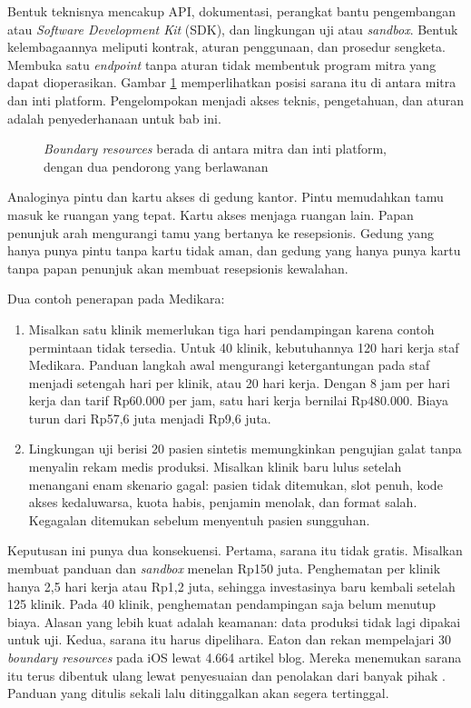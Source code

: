 Bentuk teknisnya mencakup API, dokumentasi, perangkat bantu pengembangan atau \textit{Software
Development Kit} (SDK), dan lingkungan uji atau \textit{sandbox}. Bentuk kelembagaannya meliputi
kontrak, aturan penggunaan, dan prosedur sengketa. Membuka satu \textit{endpoint} tanpa aturan tidak
membentuk program mitra yang dapat dioperasikan. Gambar \ref{fig:ch03-boundary-resources}
memperlihatkan posisi sarana itu di antara mitra dan inti platform. Pengelompokan menjadi akses
teknis, pengetahuan, dan aturan adalah penyederhanaan untuk bab ini.

\begin{figure}[!htb]
  \centering
  
  \caption{\textit{Boundary resources} berada di antara mitra dan inti platform, dengan dua pendorong
           yang berlawanan}
  \label{fig:ch03-boundary-resources}
\end{figure}

Analoginya pintu dan kartu akses di gedung kantor. Pintu memudahkan tamu masuk ke ruangan yang tepat.
Kartu akses menjaga ruangan lain. Papan penunjuk arah mengurangi tamu yang bertanya ke resepsionis.
Gedung yang hanya punya pintu tanpa kartu tidak aman, dan gedung yang hanya punya kartu tanpa papan
penunjuk akan membuat resepsionis kewalahan.

Dua contoh penerapan pada Medikara:
\begin{enumerate}
  \item Misalkan satu klinik memerlukan tiga hari pendampingan karena contoh permintaan tidak tersedia.
        Untuk 40 klinik, kebutuhannya 120 hari kerja staf Medikara. Panduan langkah awal mengurangi
        ketergantungan pada staf menjadi setengah hari per klinik, atau 20 hari kerja. Dengan 8 jam
        per hari kerja dan tarif Rp60.000 per jam, satu hari kerja bernilai Rp480.000. Biaya turun dari
        Rp57,6 juta menjadi Rp9,6 juta.
  \item Lingkungan uji berisi 20 pasien sintetis memungkinkan pengujian galat tanpa menyalin rekam medis
        produksi. Misalkan klinik baru lulus setelah menangani enam skenario gagal: pasien tidak
        ditemukan, slot penuh, kode akses kedaluwarsa, kuota habis, penjamin menolak, dan format salah.
        Kegagalan ditemukan sebelum menyentuh pasien sungguhan.
\end{enumerate}

Keputusan ini punya dua konsekuensi. Pertama, sarana itu tidak gratis. Misalkan membuat panduan dan
\textit{sandbox} menelan Rp150 juta. Penghematan per klinik hanya 2,5 hari kerja atau Rp1,2 juta,
sehingga investasinya baru kembali setelah 125 klinik. Pada 40 klinik, penghematan pendampingan saja
belum menutup biaya. Alasan yang lebih kuat adalah keamanan: data produksi tidak lagi dipakai untuk
uji. Kedua, sarana itu harus dipelihara. Eaton dan rekan mempelajari 30 \textit{boundary resources}
pada iOS lewat 4.664 artikel blog. Mereka menemukan sarana itu terus dibentuk ulang lewat penyesuaian
dan penolakan dari banyak pihak \cite{eaton2015distributed}. Panduan yang ditulis sekali lalu
ditinggalkan akan segera tertinggal.

